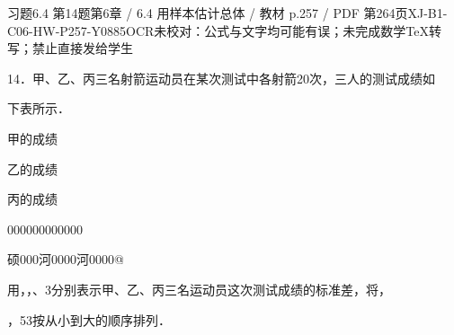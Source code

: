\begin{bankitem}{习题6.4 第14题}{第6章 / 6.4 用样本估计总体 / 教材 p.257 / PDF 第264页}{XJ-B1-C06-HW-P257-Y0885}{OCR未校对：公式与文字均可能有误；未完成数学TeX转写；禁止直接发给学生}
\begin{ocrdraft}
\par
14．甲、乙、丙三名射箭运动员在某次测试中各射箭20次，三人的测试成绩如
\par
下表所示．
\par
甲的成绩
\par
乙的成绩
\par
丙的成绩
\par
000000000000
\par
硕000河0000河0000@
\par
用，，、3分别表示甲、乙、丙三名运动员这次测试成绩的标准差，将，
\par
{}，53按从小到大的顺序排列．
\end{ocrdraft}
\end{bankitem}
